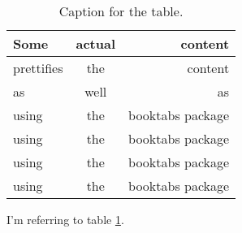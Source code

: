 \documentclass{article}
\begin{document}
\begin{table}[h!]
  \centering
  \caption{Caption for the table.}
  \label{tab:table1}
  \begin{tabular}{lcr}
    \toprule
    Some & actual & content\\
    \midrule
    prettifies & the & content\\
    as & well & as\\
    using & the & booktabs package\\
    using & the & booktabs package\\
    using & the & booktabs package\\
   \hline
    using & the & booktabs package\\
    \bottomrule
  \end{tabular}
\end{table}

I'm referring to table \ref{tab:table1}.
\end{document}
